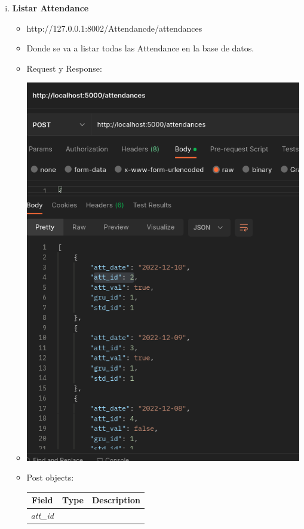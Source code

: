 \documentclass{article}
\begin{document}
\begin{enumerate}[i.]
    \item \textbf{Listar Attendance}
    \begin{itemize}
        \item http://127.0.0.1:8002/Attendancde/attendances
        \item Donde se va a listar todas las Attendance en la base de datos.
        \item Request y Response:
        \item \includegraphics[scale=.5]{assets/attendance/atendances.png}
        \item Post objects:
        \begin{table}[H] \centering \begin{tabular}{|l|l|l|} \hline
        \multicolumn{1}{|c|}{\textbf{Field}} &
        \multicolumn{1}{c|}{\textbf{Type}} &
        \multicolumn{1}{c|}{\textbf{Description}} \\ \hline \textit{att\_id} &

\end{tabular}
\end{table}
\end{itemize}
\end{enumerate}
\end{document}
